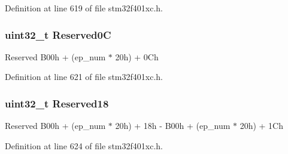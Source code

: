 Definition at line 619 of file stm32f401xc.\+h.

\subsubsection[{\texorpdfstring{Reserved0C}{Reserved0C}}]{\setlength{\rightskip}{0pt plus 5cm}uint32\+\_\+t Reserved0C}\hypertarget{struct_u_s_b___o_t_g___o_u_t_endpoint_type_def_a1bcc039378b4ed4ac1261a0a758c3d1d}{}\label{struct_u_s_b___o_t_g___o_u_t_endpoint_type_def_a1bcc039378b4ed4ac1261a0a758c3d1d}
Reserved B00h + (ep\+\_\+num $\ast$ 20h) + 0\+Ch 

Definition at line 621 of file stm32f401xc.\+h.

\subsubsection[{\texorpdfstring{Reserved18}{Reserved18}}]{\setlength{\rightskip}{0pt plus 5cm}uint32\+\_\+t Reserved18}\hypertarget{struct_u_s_b___o_t_g___o_u_t_endpoint_type_def_a98a4d649c554bb2c4ff0b6f36e9ce9f5}{}\label{struct_u_s_b___o_t_g___o_u_t_endpoint_type_def_a98a4d649c554bb2c4ff0b6f36e9ce9f5}
Reserved B00h + (ep\+\_\+num $\ast$ 20h) + 18h -\/ B00h + (ep\+\_\+num $\ast$ 20h) + 1\+Ch 

Definition at line 624 of file stm32f401xc.\+h.



